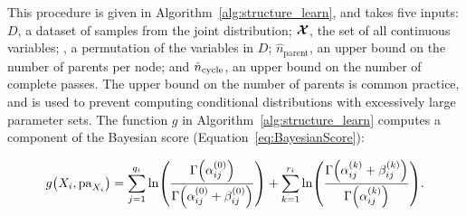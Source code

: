 This procedure is given in Algorithm~\ref{alg:structure_learn}, and takes five inputs: $D$, a dataset of samples from the joint distribution; $\bm{\mathcal{X}}$, the set of all continuous variables; , a permutation of the variables in $D$; $\hat{n}_\text{parent}$, an upper bound on the number of parents per node; and $\hat{n}_\text{cycle}$, an upper bound on the number of complete passes.
The upper bound on the number of parents is common practice, and is used to prevent computing conditional distributions with excessively large parameter sets.
The function $g$ in Algorithm~\ref{alg:structure_learn} computes a component of the Bayesian score (Equation~\ref{eq:BayesianScore}):

\begin{equation}
  \label{eq:B_Score_one}
  g\paren{X_i, \Pa_{X_i}} =  \sum_{j=1}^{q_i} \ln\paren{
    \frac{
      \mathrm{\Gamma}\paren{\alpha_{ij}^{(0)}}
    }{
      \mathrm{\Gamma}\paren{\alpha_{ij}^{(0)} + \beta_{ij}^{(0)}}
    }
  } + \sum_{k=1}^{r_i} \ln \paren{
    \frac{
      \mathrm{\Gamma}\paren{\alpha_{ij}^{(k)} + \beta_{ij}^{(k)}}
    }{
      \mathrm{\Gamma}\paren{\alpha_{ij}^{(k)}}
    }
  }\text{.}
\end{equation}


